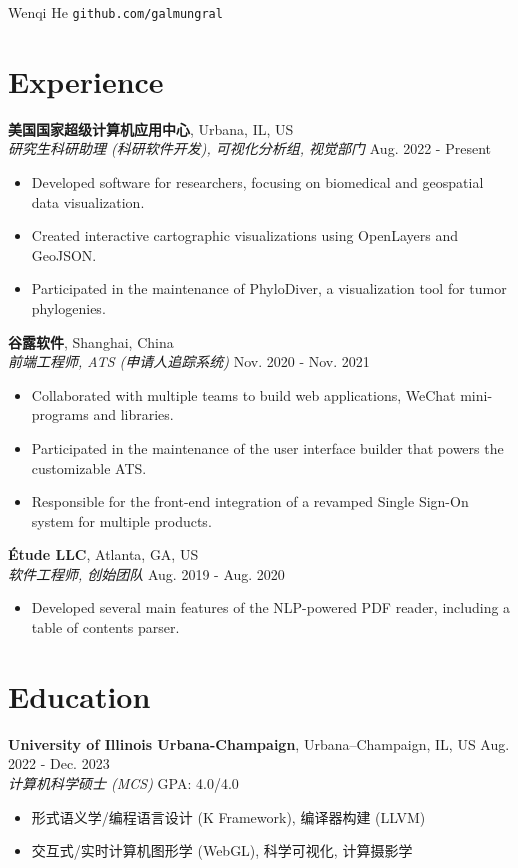 \documentclass[12pt]{article}
\begin{document}
{\Huge Wenqi He} \quad \texttt{github.com/galmungral}

\section*{Experience}

\textbf{美国国家超级计算机应用中心}, Urbana, IL, US\\
\textit{研究生科研助理 (科研软件开发), 可视化分析组, 视觉部门} \hfill Aug. 2022 - Present
\begin{itemize}
\item Developed software for researchers, focusing on biomedical and geospatial data visualization.
\item Created interactive cartographic visualizations using OpenLayers and GeoJSON.
\item Participated in the maintenance of PhyloDiver, a visualization tool for tumor phylogenies.
\end{itemize}

\textbf{谷露软件}, Shanghai, China\\
\textit{前端工程师, ATS (申请人追踪系统)} \hfill Nov. 2020 - Nov. 2021
\begin{itemize}
\item Collaborated with multiple teams to build web applications, WeChat mini-programs and libraries.
\item Participated in the maintenance of the user interface builder that powers the customizable ATS.
\item Responsible for the front-end integration of a revamped Single Sign-On system for multiple products.
\end{itemize}

\textbf{Étude LLC}, Atlanta, GA, US\\
\textit{软件工程师, 创始团队} \hfill Aug. 2019 - Aug. 2020
\begin{itemize}
\item Developed several main features of the NLP-powered PDF reader, including a table of contents parser.
\end{itemize}

\section*{Education}
\textbf{University of Illinois Urbana-Champaign}, Urbana–Champaign, IL, US \hfill Aug. 2022 - Dec. 2023 \\
\textit{计算机科学硕士 (MCS)}  \hfill GPA: 4.0/4.0 
\begin{itemize}
\small
\item 形式语义学/编程语言设计 (K Framework), 编译器构建 (LLVM)
\item 交互式/实时计算机图形学 (WebGL), 科学可视化, 计算摄影学
\end{itemize}
\end{document}

